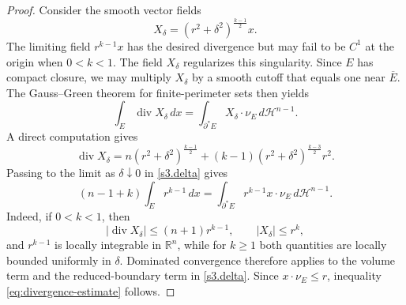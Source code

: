 \documentclass[11pt,reqno]{amsart}
\numberwithin{equation}{section}
\theoremstyle{definition}
\newcommand{\calH}{\mathcal H}
\newcommand{\diver}{\operatorname{div}}
\begin{document}
\begin{proof}
Consider the smooth vector fields
\begin{equation*}
    X_\delta=(r^2+\delta^2)^{\frac{k-1}{2}}x.
\end{equation*}
The limiting field $r^{k-1}x$ has the desired divergence but may fail to be $C^1$ at the origin when $0<k<1$.  The field $X_\delta$ regularizes this singularity.  Since $E$ has compact closure, we may multiply $X_\delta$ by a smooth cutoff that equals one near $\overline E$.  The Gauss--Green theorem for finite-perimeter sets \cite[Theorem~15.9]{Maggi2012} then yields
\begin{equation}\label{s3.delta}
\int_E\diver X_\delta\,dx
=\int_{\partial^*E} X_\delta\cdot\nu_E\,d\calH^{n-1}.
\end{equation}
A direct computation gives
\begin{equation*}
    \diver X_{\delta} = n \left( r^2 + \delta^2 \right)^{\frac{k-1}{2}} + (k-1)\left( r^2 + \delta^2 \right)^{\frac{k-3}{2}}r^2.
\end{equation*}
Passing to the limit as $\delta\downarrow 0$ in \eqref{s3.delta} gives
\begin{equation}\label{eq:weighted-divergence-identity}
    (n-1+k)\int_E r^{k-1}\,dx
    =\int_{\partial^*E}r^{k-1}x\cdot\nu_E\,d\calH^{n-1}.
\end{equation}
Indeed, if $0<k<1$, then
\begin{equation*}
    |\diver X_\delta|  \leq (n+1) r^{k-1},
    \qquad
    |X_\delta|\leq r^k,
\end{equation*}
and $r^{k-1}$ is locally integrable in $\mathbb{R}^n$, while for $k\geq1$ both quantities are locally bounded uniformly in $\delta$.  Dominated convergence therefore applies to the volume term and the reduced-boundary term in \eqref{s3.delta}. Since $x\cdot\nu_E\leq r$, inequality \eqref{eq:divergence-estimate} follows.



\end{proof}
\end{document}
